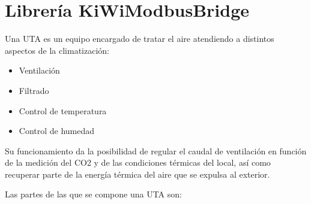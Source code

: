 
\cleardoublepage
\chapter{Librería KiWiModbusBridge}

\label{chap:anexoLibreriaBridge} %

Una UTA es un equipo encargado de tratar el aire atendiendo a distintos aspectos de la climatización:

\begin{itemize}
    \item Ventilación
    \item Filtrado
    \item Control de temperatura
    \item Control de humedad
\end{itemize}

Su funcionamiento da la posibilidad de regular el caudal de ventilación en función de la medición del CO2 y de las condiciones térmicas del local, así como recuperar parte de la energía térmica del aire que se expulsa al exterior.

Las partes de las que se compone una UTA son:

